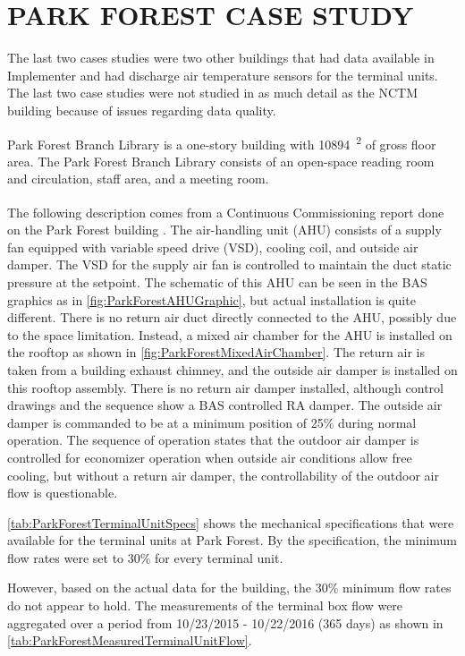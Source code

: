 \chapter{\texorpdfstring{\MakeUppercase{Park Forest Case Study}}{Park Forest Case Study}}

The last two cases studies were two other buildings that had data
available in Implementer and had discharge air temperature sensors for
the terminal units. The last two case studies were not studied in as
much detail as the NCTM building because of issues regarding data
quality.

Park Forest Branch Library is a one-story building with
\SI{10894}{\feet\squared} of gross floor area. The Park Forest Branch
Library consists of an open-space reading room and circulation, staff
area, and a meeting room. 

The following description comes from a Continuous
Commissioning\textsuperscript{\textregistered{}} report done on the Park
Forest building \cite{ParkForestReport}. The air-handling unit (AHU)
consists of a supply fan equipped with variable speed drive (VSD),
cooling coil, and outside air damper. The VSD for the supply air fan is
controlled to maintain the duct static pressure at the setpoint. The
schematic of this AHU can be seen in the BAS graphics as in \figref{}
\ref{fig:ParkForestAHUGraphic}, but actual installation is quite
different. There is no return air duct directly connected to the AHU,
possibly due to the space limitation. Instead, a mixed air chamber for
the AHU is installed on the rooftop as shown in \figref{}
\ref{fig:ParkForestMixedAirChamber}. The return air is taken from a
building exhaust chimney, and the outside air damper is installed on
this rooftop assembly. There is no return air damper installed,
although control drawings and the sequence show a BAS controlled RA
damper. The outside air  damper is commanded to be at a minimum
position of 25\% during normal operation. The sequence of operation
states that the outdoor air damper is controlled for economizer operation when
outside air conditions allow free cooling, but without a return air
damper, the controllability of the outdoor air flow is questionable.

\tableref{} \ref{tab:ParkForestTerminalUnitSpecs} shows the
mechanical specifications that were available for the terminal units at
Park Forest. By the specification, the minimum flow rates were set to
30\% for every terminal unit. 

However, based on the actual data for the building, the 30\% minimum
flow rates do not appear to hold. The measurements of the terminal
box flow were aggregated over a period from 10/23/2015 - 10/22/2016
(365 days) as shown in \tableref{}
\ref{tab:ParkForestMeasuredTerminalUnitFlow}. 

